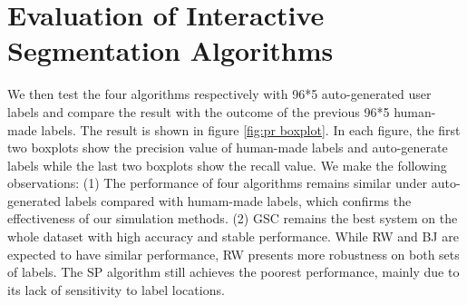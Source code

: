 \documentclass[runningheads,a4paper]{llncs}
\begin{document}
\section{Evaluation of Interactive Segmentation Algorithms}
We then test the four algorithms respectively with 96*5 auto-generated user labels and compare the result with the outcome of the previous 96*5 human-made labels. The result is shown in figure \ref{fig:pr boxplot}. In each figure, the first two boxplots show the precision value of human-made labels and auto-generate labels while the last two boxplots show the recall value. We make the following observations: (1) The performance of four algorithms remains similar under auto-generated  labels compared with humam-made labels, which confirms the effectiveness of our simulation methods. (2) GSC \citep{gulshan2010geodesic} remains the best system on the whole dataset with high accuracy and stable performance. While RW \citep {grady2006random} and BJ \citep{boykov2001interactive}are expected to have similar performance, RW presents more robustness on both sets of labels. The SP\citep{bai2007geodesic} algorithm still achieves the poorest performance, mainly due to its lack of sensitivity to label locations.
\end{document}
